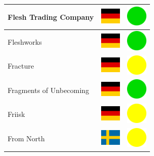 \documentclass[12pt, a4paper, twoside]{report}
\begin{document}
\begin{center}
\begin{longtable}{|p{5cm}|p{2cm}|p{2cm}|}
 Flesh Trading Company                                      & \includegraphics[width=1cm]{../img/flags/de} &   \includegraphics[width=1cm]{../likes/y} \\ \hline
 Fleshworks                                                 & \includegraphics[width=1cm]{../img/flags/de} &   \includegraphics[width=1cm]{../likes/y} \\ \hline
 Fracture                                                   & \includegraphics[width=1cm]{../img/flags/de} &   \includegraphics[width=1cm]{../likes/m} \\ \hline
 Fragments of Unbecoming                                    & \includegraphics[width=1cm]{../img/flags/de} &   \includegraphics[width=1cm]{../likes/y} \\ \hline
 Friisk                                                     & \includegraphics[width=1cm]{../img/flags/de} &   \includegraphics[width=1cm]{../likes/m} \\ \hline
 From North                                                 & \includegraphics[width=1cm]{../img/flags/se} &   \includegraphics[width=1cm]{../likes/m} \\ \hline

\end{longtable}
\end{center}
\end{document}
